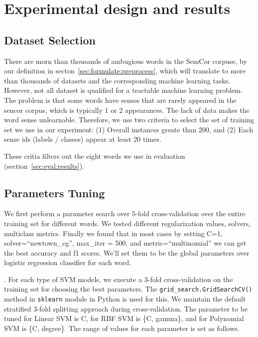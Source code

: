 \section{Experimental design and results}

\subsection{Dataset Selection}

There are morn than thousands of ambugious words in the SemCor corpuse, by our
definition in secton~\ref{sec:formulate:preprocess}, which will translate to
more than thousands of datasets and the corresponding machine learning tasks.
However, not all dataset is qualified for a tractable machine learning problem. 
The problem is that some words have senses that are rarely appeared in the
sencor corpus, which is typically 1 or 2 appearances.
The lack of data makes the word sense unlearnable.
Therefore, we use two criteria to select the set of training set we use in our
experiment:
(1) Overall instances greate than 200, 
and (2) Each sense ids (labels / classes) appear at least 20 times.

These critia filters out the eight words we use in evaluation
(section~\ref{sec:eval:results}).

\subsection{Parameters Tuning}

We first perform a parameter search over 5-fold cross-validation over the entire
training set for different words. We tested different regularization values,
solvers, multiclass metrics. Finally we found that in most cases by setting C=1,
solver=``newtown\_cg'', max\_iter = 500, and metric=``multinomial'' we can get
the best accuracy and f1 scores. We'll set them to be the global parameters over
logistic regression classifier for each word. 

.
For each type of SVM models, we execute a 3-fold cross-validation on the
training set for choosing the best parameters. The
\texttt{grid\_search.GridSearchCV()} method in \texttt{sklearn} module in Python
is used for this. We maintain the default stratified 3-fold splitting approach
during cross-validation. The parameter to be tuned for Linear SVM is C, for RBF
SVM is \{C, gamma\}, and for Polynomial SVM is \{C, degree\}. The range of
values for each parameter is set as follows.

